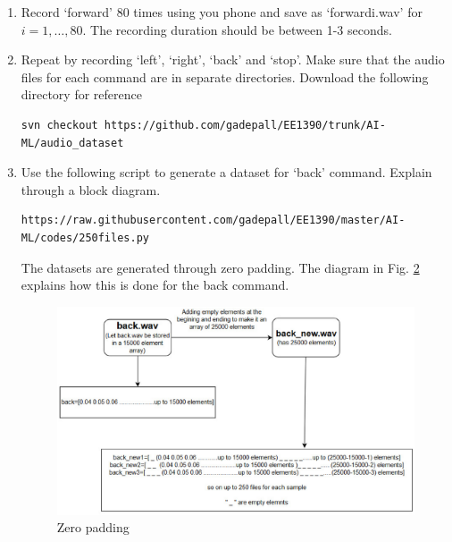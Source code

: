 \documentclass[journal,12pt,twocolumn]{IEEEtran}
\renewcommand\thesection{\arabic{section}}
\begin{document}
\begin{enumerate}[label=\thesection.\arabic*
,ref=\thesection.\theenumi]
\begin{figure}[h]
\begin{center}
\end{center}
\caption{ML System}
\label{fig:block_diag}
\end{figure}
\\
\solution See Fig. \ref{fig:block_diag}
\item Record `forward' 80 times using you phone and save as `forwardi.wav' for $i 
= 1,\dots, 80$. The recording duration should be between 1-3 seconds.
%
\item Repeat by recording `left', `right', `back' and `stop'. Make sure that the 
audio files for each command are in separate directories. Download the following 
directory for reference
\begin{lstlisting}
svn checkout https://github.com/gadepall/EE1390/trunk/AI-ML/audio_dataset
\end{lstlisting}
\item Use the following script to generate a dataset for `back' command. Explain 
through a block diagram. 
\begin{lstlisting}
https://raw.githubusercontent.com/gadepall/EE1390/master/AI-ML/codes/250files.py
\end{lstlisting}
%
\solution
The datasets are generated through zero padding.  The diagram in Fig. \ref{fig:signal_cond} explains how this 
is done for the back command.
\begin{figure}[h]
\begin{center}
\includegraphics[width=\columnwidth]{./figs/signal_cond.eps}
\end{center}
\caption{Zero padding}
\label{fig:signal_cond}
\end{figure}


\end{enumerate}
\end{document}

